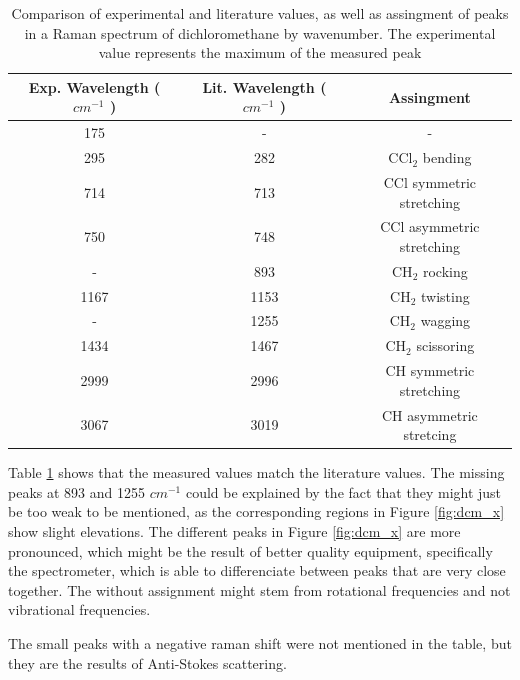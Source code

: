     \begin{table}[h]
    \begin{center}
        \vspace{10pt}
        \begin{tabular}{|c|c|c|}
         \hline
         Exp. Wavelength (\( cm^{-1} \) ) & Lit. Wavelength  (\( cm^{-1} \) ) & Assingment  \\ 
         \hline
         175 & - & - \\
         295 & 282 & CCl\(_2\) bending \\ 
         714 & 713 & CCl symmetric stretching\\
         750 & 748 & CCl asymmetric stretching\\
         - & 893 & CH\(_2\) rocking \\
         1167 & 1153 & CH\(_2\) twisting\\
         - & 1255 & CH\(_2\) wagging\\
         1434 & 1467 & CH\(_2\)  scissoring\\
         2999 & 2996 & CH symmetric stretching \\
         3067 & 3019 & CH asymmetric stretcing \\
         \hline
        \end{tabular}
        \caption{Comparison of experimental and literature \cite{dcml} values, as well as assingment of peaks in a Raman spectrum of dichloromethane by wavenumber. The experimental value represents the maximum of the measured peak }
        \label{table:dcm}
        \vspace{-15pt}
    \end{center}
    \end{table}

    Table \ref{table:dcm} shows that the measured values match the literature values. The missing peaks at 893 and 1255 \( cm^{-1}\) could be explained by the fact that they might just be too weak to be mentioned, as the corresponding regions in Figure \ref{fig:dcm_x} show slight elevations. The different peaks in Figure \ref{fig:dcm_x} are more pronounced, which might be the result of better quality equipment, specifically the spectrometer, which is able to differenciate between peaks that are very close together. The without assignment might stem from rotational frequencies and not vibrational frequencies.

    \bigskip

    The small peaks with a negative raman shift were not mentioned in the table, but they are the results of Anti-Stokes scattering.

